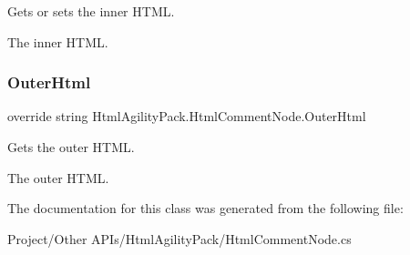 Gets or sets the inner H\+T\+ML. 

The inner H\+T\+ML.\mbox{\label{class_html_agility_pack_1_1_html_comment_node_ae1208290299bbe32fc4e4a75ca37654c}} 
\subsubsection{\texorpdfstring{Outer\+Html}{OuterHtml}}
{\footnotesize\ttfamily override string Html\+Agility\+Pack.\+Html\+Comment\+Node.\+Outer\+Html\hspace{0.3cm}{\ttfamily [get]}}



Gets the outer H\+T\+ML. 

The outer H\+T\+ML.

The documentation for this class was generated from the following file\+:\begin{DoxyCompactItemize}
\item 
Project/\+Other A\+P\+Is/\+Html\+Agility\+Pack/Html\+Comment\+Node.\+cs\end{DoxyCompactItemize}

